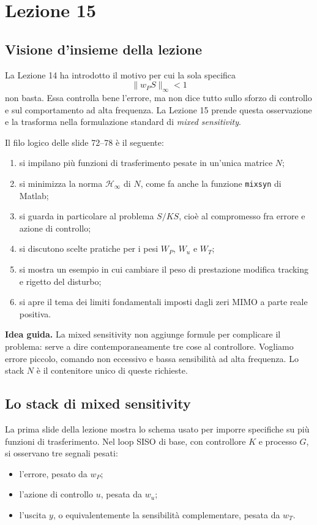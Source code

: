 \documentclass[11pt,a4paper]{article}
\begin{document}
\section{Lezione 15}

\subsection{Visione d'insieme della lezione}

La Lezione 14 ha introdotto il motivo per cui la sola specifica
$$
\|w_P S\|_\infty<1
$$
non basta. Essa controlla bene l'errore, ma non dice tutto sullo sforzo di controllo e sul comportamento ad alta frequenza. La Lezione 15 prende questa osservazione e la trasforma nella formulazione standard di \emph{mixed sensitivity}.

Il filo logico delle slide 72--78 \`e il seguente:
\begin{enumerate}
    \item si impilano pi\`u funzioni di trasferimento pesate in un'unica matrice $N$;
    \item si minimizza la norma $\mathcal{H}_\infty$ di $N$, come fa anche la funzione \texttt{mixsyn} di Matlab;
    \item si guarda in particolare al problema $S/KS$, cio\`e al compromesso fra errore e azione di controllo;
    \item si discutono scelte pratiche per i pesi $W_P$, $W_u$ e $W_T$;
    \item si mostra un esempio in cui cambiare il peso di prestazione modifica tracking e rigetto del disturbo;
    \item si apre il tema dei limiti fondamentali imposti dagli zeri MIMO a parte reale positiva.
\end{enumerate}

\begin{keybox}
\textbf{Idea guida.} La mixed sensitivity non aggiunge formule per complicare il problema: serve a dire contemporaneamente tre cose al controllore. Vogliamo errore piccolo, comando non eccessivo e bassa sensibilit\`a ad alta frequenza. Lo stack $N$ \`e il contenitore unico di queste richieste.
\end{keybox}

\subsection{Lo stack di mixed sensitivity}

La prima slide della lezione mostra lo schema usato per imporre specifiche su pi\`u funzioni di trasferimento. Nel loop SISO di base, con controllore $K$ e processo $G$, si osservano tre segnali pesati:
\begin{itemize}
    \item l'errore, pesato da $w_P$;
    \item l'azione di controllo $u$, pesata da $w_u$;
    \item l'uscita $y$, o equivalentemente la sensibilit\`a complementare, pesata da $w_T$.
\end{itemize}
\end{document}
